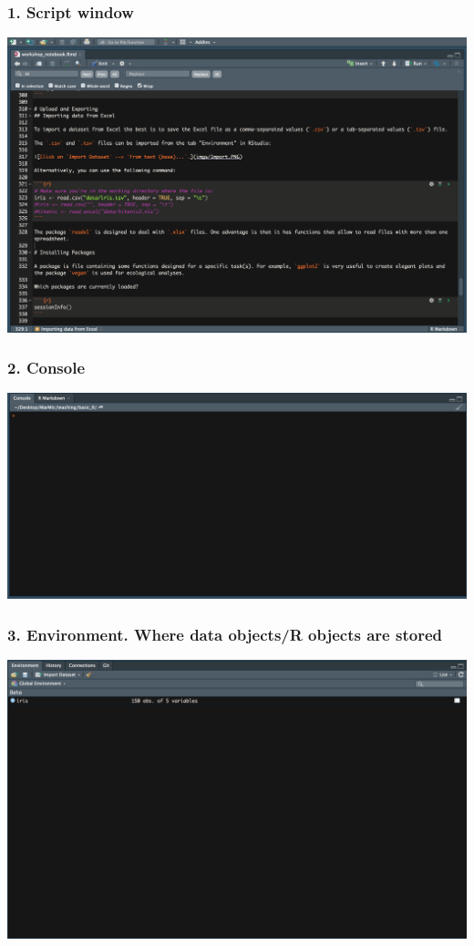 \documentclass[
]{article}
\begin{document}
\hypertarget{script-window}{%
\subsubsection{1. Script window}\label{script-window}}

\includegraphics{imgs/1_scripts.png}

\hypertarget{console}{%
\subsubsection{2. Console}\label{console}}

\includegraphics{imgs/2_console.png}

\hypertarget{environment.-where-data-objectsr-objects-are-stored}{%
\subsubsection{3. Environment. Where data objects/R objects are
stored}\label{environment.-where-data-objectsr-objects-are-stored}}

\includegraphics{imgs/3_environment.png}
\end{document}
